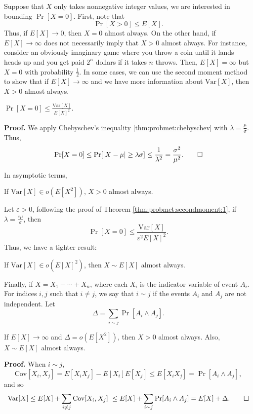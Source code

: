 Suppose that $X$ only takes nonnegative integer values, we are interested in bounding $\Pr[X = 0]$. First, note that 
\begin{equation}\label{eq:probmet:secondmoment:1}
    \Pr[X > 0] \leq E[X].   
\end{equation}
Thus, if $E[X] \to 0$, then $X = 0$ almost always. On the other hand, if $E[X] \to \infty$ does not necessarily imply that $X > 0$ almost always. For instance, consider an obviously imaginary game where you throw a coin until it lands heads up and you get paid $2^n$ dollars if it takes $n$ throws. Then, $E[X] = \infty$ but $X = 0$ with probability $\frac{1}{2}$. In some cases, we can use the second moment method to show that if $E[X] \to \infty$ and we have more information about $\text{Var}[X]$, then $X > 0$ almost always. \par

\begin{theorem}\label{thm:probmet:secondmoment:1}
    \(\Pr[X = 0] \leq \frac{\text{Var}[X]}{E[X]^2}.\)\cite{alon2016probabilistic}
\end{theorem}

\textbf{Proof. } We apply Chebyschev's inequality \ref{thm:probmet:chebyschev} with $\lambda = \frac{\mu}{\sigma}$. Thus, 
\[\Pr[X = 0] \leq \Pr[|X - \mu| \geq \lambda \sigma] \leq \frac{1}{\lambda^2} = \frac{\sigma^2}{\mu^2}. \qed \]

In asymptotic terms, 

\begin{corollary}\label{cor:probmet:secondmoment:1}
    If $\text{Var}[X] \in o(E[X^2])$, $X > 0$ almost always. \cite{alon2016probabilistic}
\end{corollary}

Let $\varepsilon > 0$, following the proof of Theorem \ref{thm:probmet:secondmoment:1}, if $\lambda = \frac{\varepsilon\mu}{\sigma}$, then
\[\Pr[X = 0] \leq \frac{\text{Var}[X]}{\varepsilon^2E[X]^2}.\]
Thus, we have a tighter result:
\begin{corollary}\label{cor:probmet:secondmoment:2}
    If $\text{Var}[X] \in o(E[X]^2)$, then $X \sim E[X]$ almost always. \cite{alon2016probabilistic}
\end{corollary}

Finally, if $X = X_1 + \cdots + X_n$, where each $X_i$ is the indicator variable of event $A_i$. For indices $i, j$ such that $i \neq j$, we say that $i \sim j$ if the events $A_i$ and $A_j$ are not independent. Let
\[\Delta  = \sum_{i \sim j} \Pr[A_i \wedge A_j].\]
\begin{corollary}\label{cor:probmet:secondmoment:3}
    If $E[X] \to \infty$ and $\Delta = o(E[X^2])$, then $X > 0$ almost always. Also, $X \sim E[X]$ almost always. \cite{alon2016probabilistic}
\end{corollary}
\textbf{Proof. } When $i \sim j$, 
\[\text{Cov}[X_i, X_j] = E[X_iX_j] - E[X_i]E[X_j] \leq E[X_iX_j] = \Pr[A_i \wedge A_j],\]
and so 
\[\text{Var}[X] \leq E[X] + \sum_{i \neq j}\text{Cov}[X_i, X_j] \leq E[X] + \sum_{i \sim j}\Pr[A_i \wedge A_j] = E[X] + \Delta. \qed\]

